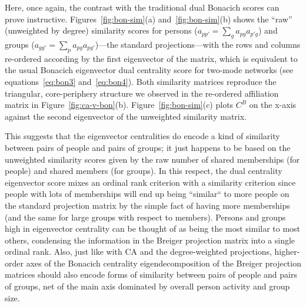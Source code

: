 \documentclass[a4paper,fleqn]{cas-sc}
\begin{document}
Here, once again, the contrast with the traditional dual Bonacich scores can prove instructive. Figures~\ref{fig:bon-sim}(a) and~\ref{fig:bon-sim}(b) shows the ``raw'' (unweighted by degree) similarity scores for persons ($a_{pp'} = \sum_g a_{pg}a_{p'g}$) and groups ($a_{gg'} = \sum_p a_{pg}a_{pg'}$)---the standard \citet{breiger1974duality} projections---with the rows and columns re-ordered according by the first eigenvector of the matrix, which is equivalent to the usual Bonacich eigenvector dual centrality score for two-mode networks (see equations~\ref{eq:bon3} and~\ref{eq:bon4}). Both similarity matrices reproduce the triangular, core-periphery structure we observed in the re-ordered affiliation matrix in Figure~\ref{fig:ca-v-bon}(b). Figure~\ref{fig:bon-sim}(c) plots $C^B$ on the x-axis against the second eigenvector of the unweighted similarity matrix. 

This suggests that the eigenvector centralities do encode a kind of similarity between pairs of people and pairs of groups; it just happens to be based on the unweighted similarity scores given by the raw number of shared memberships (for people) and shared members (for groups). In this respect, the dual centrality eigenvector score mixes an ordinal rank criterion with a similarity criterion since people with lots of memberships will end up being ``similar`` to more people on the standard projection matrix by the simple fact of having more memberships (and the same for large groups with respect to members). Persons and groups high in eigenvector centrality can be thought of as being the most similar to most others, condensing the information in the Breiger projection matrix into a single ordinal rank. Also, just like with CA and the degree-weighted projections, higher-order axes of the Bonacich centrality eigendecomposition of the Breiger projection matrices should also encode forms of similarity between pairs of people and pairs of groups, net of the main axis dominated by overall person activity and group size.  
\end{document}
